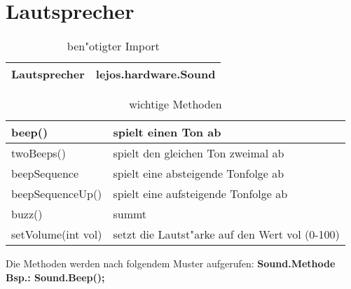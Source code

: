 \section{Lautsprecher}
	\begin{table}[h]
		\begin{tabular}{|p{}| p{}|}
			\hline
			Lautsprecher& lejos.hardware.Sound
			\\ \hline 
		\end{tabular}
		\caption{ben"otigter Import}
	\end{table}
	
	\begin{table}[H]
		\begin{tabular}{|p{}| p{}|}
			\hline
			beep()& spielt einen Ton ab \\ \hline 
			twoBeeps() &  spielt den gleichen Ton zweimal ab\\ \hline 
			beepSequence & spielt eine absteigende Tonfolge ab\\ \hline
			beepSequenceUp()& spielt eine aufsteigende Tonfolge ab \\ \hline 
			buzz()& summt \\ \hline 
			setVolume(int vol)& setzt die Lautst"arke auf den Wert vol (0-100) \\ \hline 
		\end{tabular}
		\caption{wichtige Methoden}
	\end{table}
	Die Methoden werden nach folgendem Muster aufgerufen: \textbf{Sound.Methode}\\
	\textbf{Bsp.: Sound.Beep();}
